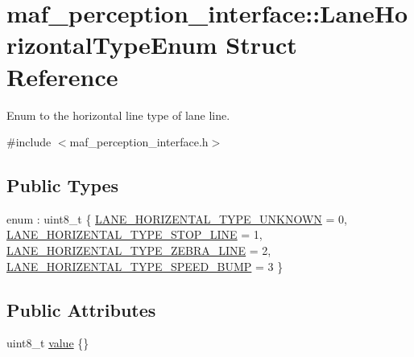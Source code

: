 \hypertarget{structmaf__perception__interface_1_1LaneHorizontalTypeEnum}{}\section{maf\+\_\+perception\+\_\+interface\+:\+:Lane\+Horizontal\+Type\+Enum Struct Reference}
\label{structmaf__perception__interface_1_1LaneHorizontalTypeEnum}


Enum to the horizontal line type of lane line.  




{\ttfamily \#include $<$maf\+\_\+perception\+\_\+interface.\+h$>$}

\subsection*{Public Types}
\begin{DoxyCompactItemize}
\item 
enum \+: uint8\+\_\+t \{ \hyperlink{structmaf__perception__interface_1_1LaneHorizontalTypeEnum_a788fa6b923d6400f931ecfc49cbb1ecda171d73e2bcc6c04dc998055befaba0d8}{L\+A\+N\+E\+\_\+\+H\+O\+R\+I\+Z\+E\+N\+T\+A\+L\+\_\+\+T\+Y\+P\+E\+\_\+\+U\+N\+K\+N\+O\+WN} = 0, 
\hyperlink{structmaf__perception__interface_1_1LaneHorizontalTypeEnum_a788fa6b923d6400f931ecfc49cbb1ecdae53d1518c4bc5f9775383870d9569ec6}{L\+A\+N\+E\+\_\+\+H\+O\+R\+I\+Z\+E\+N\+T\+A\+L\+\_\+\+T\+Y\+P\+E\+\_\+\+S\+T\+O\+P\+\_\+\+L\+I\+NE} = 1, 
\hyperlink{structmaf__perception__interface_1_1LaneHorizontalTypeEnum_a788fa6b923d6400f931ecfc49cbb1ecda342dc616ca18c4ca8e078a8d230676e1}{L\+A\+N\+E\+\_\+\+H\+O\+R\+I\+Z\+E\+N\+T\+A\+L\+\_\+\+T\+Y\+P\+E\+\_\+\+Z\+E\+B\+R\+A\+\_\+\+L\+I\+NE} = 2, 
\hyperlink{structmaf__perception__interface_1_1LaneHorizontalTypeEnum_a788fa6b923d6400f931ecfc49cbb1ecda3bebb50f5bd097b11f70962963f1e67a}{L\+A\+N\+E\+\_\+\+H\+O\+R\+I\+Z\+E\+N\+T\+A\+L\+\_\+\+T\+Y\+P\+E\+\_\+\+S\+P\+E\+E\+D\+\_\+\+B\+U\+MP} = 3
 \}
\end{DoxyCompactItemize}
\subsection*{Public Attributes}
\begin{DoxyCompactItemize}
\item 
uint8\+\_\+t \hyperlink{structmaf__perception__interface_1_1LaneHorizontalTypeEnum_a6cb3dd2799a1d714c1b92dc5636d75b9}{value} \{\}
\end{DoxyCompactItemize}


